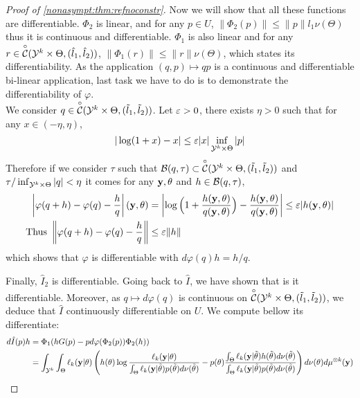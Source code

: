\begin{proof}[Proof of \cref{nonasympt:thm:refnoconstr}]
    Now we will show that all these functions are differentiable. $\Phi_2$ is linear, and for any $p\in U$,
        $\|\Phi_2(p)\| \leq\|p\| l_1\nu(\Theta)$
    thus it is continuous and differentiable. $\Phi_1$ is also linear and for any $r\in\overset{\circ}{\mathcal{C}}({\mathcal{Y}^k}\times\Theta,(\hat l_1,\hat l_2))$, $\|\Phi_1(r)\|\leq \|r\|\nu(\Theta)$, which states its differentiability. As   the application $(q,p)\mapsto qp$ is a continuous and differentiable bi-linear application, last task we have to do is to demonstrate the differentiability of $\varphi$.\\
    We consider $q\in\overset{\circ}{\mathcal{C}}({\mathcal{Y}^k}\times\Theta,(\tilde l_1,\tilde l_2))$. Let $\varepsilon>0$, there exists $\eta>0$ such that for any $x\in(-\eta,\eta)$, 
        $$|\log(1+x)-x| \leq \varepsilon|x|\inf_{{\mathcal{Y}^k}\times\Theta}|p|$$
    Therefore if we consider $\tau$ such that $\mathcal{B}(q,\tau)\subset\overset{\circ}{\mathcal{C}}({\mathcal{Y}^k}\times\Theta,(\tilde l_1,\tilde l_2))$ and $\tau/\inf_{{\mathcal{Y}^k}\times\Theta}|q|<\eta$ it comes for any $\mathbf{y},\theta$ and $h\in\mathcal{B}(q,\tau)$,
        \begin{align*}
            \left|\varphi(q+h)-\varphi(q)-\frac{h}{q}\right|(\mathbf{y},\theta) &= \left|\log\Big(1+\frac{h(\mathbf{y},\theta)}{q(\mathbf{y},\theta)}\Big)-\frac{h(\mathbf{y},\theta)}{q(\mathbf{y},\theta)}\right|\leq \varepsilon |h(\mathbf{y},\theta)|\\
            \mbox{Thus }\left\|\varphi(q+h)-\varphi(q)-\frac{h}{q}\right\| &\leq\varepsilon\|h\|
        \end{align*}
    which shows that $\varphi$ is differentiable with $d\varphi(q)h=h/q$.
    
    Finally, $\hat I_2$ is differentiable.
    Going back to $\hat I$, we have shown that is it differentiable.
    Moreover, as $q\mapsto d\varphi(q)$ is continuous on $\overset{\circ}{\mathcal{C}}({\mathcal{Y}^k}\times\Theta,(\tilde l_1,\tilde l_2))$, we deduce that $\hat I$ continuously differentiable on $U$. 
    We compute bellow its differentiate:
    \begin{align}\label{eq:differI}
        d\hat I(p)h &= \Phi_1(hG(p)-pd\varphi(\Phi_2 (p))\Phi_2(h))\\
                &= \int_{\mathcal{Y}^k}\int_\Theta  \ell_k(\mathbf{y}|\theta)\left( h(\theta) \log\frac{\ell_k(\mathbf{y}|\theta)}{\int_\Theta \ell_k(\mathbf{y}|\tilde\theta)p(\tilde\theta)d\nu(\tilde\theta)} - p(\theta)\frac{\int_\Theta \ell_k(\mathbf{y}|\tilde\theta)h(\tilde\theta)d\nu(\tilde\theta)}{\int_\Theta \ell_k(\mathbf{y}|\tilde\theta)p(\tilde\theta)d\nu(\tilde\theta)} \right)d\nu(\theta)d\mu^{\otimes k}(\mathbf{y}) \nonumber
    \end{align}
    

\end{proof}
